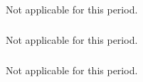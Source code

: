   \subparagraph{}
  \label{component-architecture@extract-smc}
  Not applicable for this period.
  
  \subparagraph{}
  \label{component-architecture@workflow}
  Not applicable for this period.
  
  \subparagraph{}
  \label{component-architecture@oommf-python-interface}
  Not applicable for this period.

  

